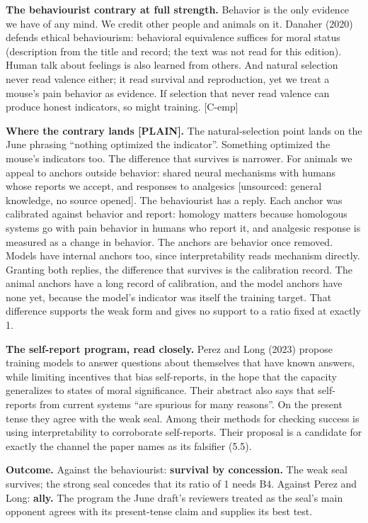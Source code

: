 \documentclass[11pt]{article}
\newcommand{\register}[1]{{\ttfamily\small #1}}
\begin{document}
\textbf{The behaviourist contrary at full strength.} Behavior is the only evidence we have of any mind. We credit other people and animals on it. Danaher (2020) defends ethical behaviourism: behavioral equivalence suffices for moral status (description from the title and record; the text was not read for this edition). Human talk about feelings is also learned from others. And natural selection never read valence either; it read survival and reproduction, yet we treat a mouse's pain behavior as evidence. If selection that never read valence can produce honest indicators, so might training. [C-emp]

\textbf{Where the contrary lands \register{[PLAIN]}.} The natural-selection point lands on the June phrasing ``nothing optimized the indicator''. Something optimized the mouse's indicators too. The difference that survives is narrower. For animals we appeal to anchors outside behavior: shared neural mechanisms with humans whose reports we accept, and responses to analgesics [unsourced: general knowledge, no source opened]. The behaviourist has a reply. Each anchor was calibrated against behavior and report: homology matters because homologous systems go with pain behavior in humans who report it, and analgesic response is measured as a change in behavior. The anchors are behavior once removed. Models have internal anchors too, since interpretability reads mechanism directly. Granting both replies, the difference that survives is the calibration record. The animal anchors have a long record of calibration, and the model anchors have none yet, because the model's indicator was itself the training target. That difference supports the weak form and gives no support to a ratio fixed at exactly 1.

\textbf{The self-report program, read closely.} Perez and Long (2023) propose training models to answer questions about themselves that have known answers, while limiting incentives that bias self-reports, in the hope that the capacity generalizes to states of moral significance. Their abstract also says that self-reports from current systems ``are spurious for many reasons''. On the present tense they agree with the weak seal. Among their methods for checking success is using interpretability to corroborate self-reports. Their proposal is a candidate for exactly the channel the paper names as its falsifier (5.5).

\textbf{Outcome.} Against the behaviourist: \textbf{survival by concession.} The weak seal survives; the strong seal concedes that its ratio of 1 needs B4. Against Perez and Long: \textbf{ally.} The program the June draft's reviewers treated as the seal's main opponent agrees with its present-tense claim and supplies its best test.
\end{document}
